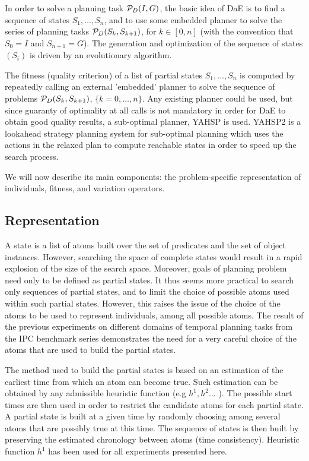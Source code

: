 \documentclass{article}
\begin{document}
In order to solve a planning task ${\cal P}_D(I,G)$, the basic idea of DaE is to find a sequence of states $S_1, \ldots, S_n$, and to use some embedded planner to solve the series of planning tasks ${\cal P}_D(S_{k},S_{k+1})$, for $k \in [0,n]$ (with the convention that $S_0 = I$ and $S_{n+1} = G$). The generation and optimization of the sequence of states $(S_i)$ is driven by an evolutionary algorithm. 

The fitness (quality criterion) of a list of partial states $S_1, \ldots, S_n$ is computed by repeatedly calling an external 'embedded' planner to solve the sequence of problems ${\cal P}_D(S_{k},S_{k+1})$, $\{k=0,\ldots,n\}$. Any existing planner could be used, but since guaranty of optimality at all calls is not mandatory in order for DaE to obtain good quality results, a sub-optimal planner, YAHSP is used. YAHSP2 \cite{V:icaps04} is a lookahead strategy planning system for sub-optimal planning which uses the  actions in the relaxed plan to compute reachable states in order to speed up the search process. 

We will now describe its main components: the problem-specific representation of individuals, fitness, and variation operators.

\subsection{Representation}
\label{section:representation}
A state is a list of atoms built over the set of predicates and the set of object instances. However, searching the space of complete states would result in a rapid explosion of the size of the search space. Moreover, goals of planning problem need only to be defined as partial states. It thus seems more practical to search only sequences of partial states, and to limit the choice of possible atoms used within such partial states. However, this raises the issue of the choice of the atoms to be used to represent individuals, among all possible atoms. The result of the previous experiments on different domains of temporal planning tasks from the IPC benchmark series \cite{BibEvoCop2009} demonstrates the need for a very careful choice of the atoms that are used to build the partial states. 

The method used to build the partial states is based on an estimation of the earliest time from which an atom can become true. Such estimation can be obtained by any admissible heuristic function (e.g $h^1,h^2...$ \cite{HaslumGeffner-AIPS-2000}). The possible start times are then used in order to restrict the candidate atoms for each partial state. A partial state is built at a given time by randomly choosing among several atoms that are possibly true at this time. The sequence of states is then built by preserving the estimated chronology between atoms (time consistency). Heuristic function $h^1$ has been used for all experiments presented here.
\end{document}
